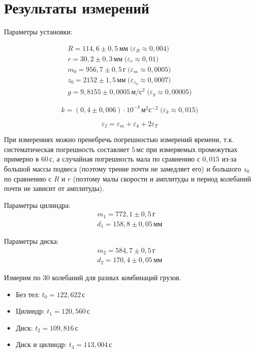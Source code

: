 \section{Результаты измерений}
Параметры установки:

\begin{gather*}
    R=114{,}6\pm 0{,}5\,\text{мм}
    \;\text{(}\varepsilon_R\approx 0{,}004\text{)} \\
    r=30{,}2\pm 0{,}3\,\text{мм} 
    \;\text{(}\varepsilon_r\approx 0{,}01\text{)} \\
    m_0 = 956{,}7\pm 0{,}5\,\text{г}
    \;\text{(}\varepsilon_m\approx 0{,}0005\text{)} \\
    z_0 = 2152\pm 1{,}5\,\text{мм}
    \;\text{(}\varepsilon_{z_0}\approx 0{,}0007\text{)} \\
    g = 9{,}8155\pm 0{,}0005\,\text{м}/\text{с}^2
    \;\text{(}\varepsilon_g\approx 0{,}00005\text{)}
\end{gather*}

\[k=\left(0{,}4\pm 0{,}006\right)\cdot 10^{-3}\,\text{м}^2\text{с}^{-2}
\;\text{(}\varepsilon_k\approx 0{,}015\text{)}\]

\[\varepsilon_I=\varepsilon_m+\varepsilon_k+2\varepsilon_T\]

При измерениях можно пренебречь погрешностью измерений времени, т.к. систематическая
погрешность составляет $5\,\text{мс}$ при измеряемых промежутках примерно в $60\,\text{с}$,
а случайная погрешность мала по сравнению с $0{,}015$ из-за большой массы подвеса (поэтому
трение почти не замедляет его) и большого $z_0$ по сравнению с $R$ и $r$ (поэтому малы
скорости и амплитуды и период колебаний почти не зависит от амплитуды).

Параметры цилиндра:
\begin{gather*}
    m_1 = 772{,}1\pm 0{,}5\,\text{г} \\
    d_1 = 158{,}8\pm 0{,}05\,\text{мм}
\end{gather*}

Параметры диска:
\begin{gather*}
    m_2 = 584{,}7\pm 0{,}5\,\text{г} \\
    d_2 = 170{,}4\pm 0{,}05\,\text{мм}
\end{gather*}

Измерим по 30 колебаний для разных комбинаций грузов.
\begin{itemize}
    \item Без тел: $t_0=122{,}622\,\text{с}$
    \item Цилиндр: $t_1=120{,}560\,\text{с}$
    \item Диск: $t_2=109{,}816\,\text{с}$
    \item Диск и цилиндр: $t_3=113{,}004\,\text{с}$
\end{itemize}

